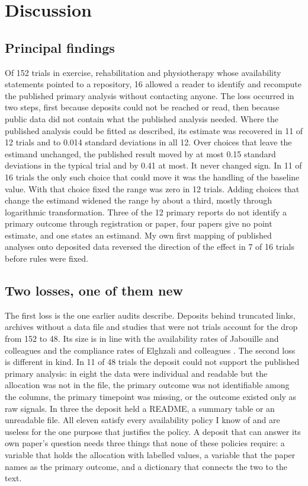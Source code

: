 \section{Discussion}\label{discussion}

\subsection{Principal findings}\label{principal-findings}

Of 152 trials in exercise, rehabilitation and physiotherapy whose availability statements pointed to a repository, 16 allowed a reader to identify and recompute the published primary analysis without contacting anyone. The loss occurred in two steps, first because deposits could not be reached or read, then because public data did not contain what the published analysis needed. Where the published analysis could be fitted as described, its estimate was recovered in 11 of 12 trials and to 0.014 standard deviations in all 12. Over choices that leave the estimand unchanged, the published result moved by at most 0.15 standard deviations in the typical trial and by 0.41 at most. It never changed sign. In 11 of 16 trials the only such choice that could move it was the handling of the baseline value. With that choice fixed the range was zero in 12 trials. Adding choices that change the estimand widened the range by about a third, mostly through logarithmic transformation. Three of the 12 primary reports do not identify a primary outcome through registration or paper, four papers give no point estimate, and one states an estimand. My own first mapping of published analyses onto deposited data reversed the direction of the effect in 7 of 16 trials before rules were fixed.

\subsection{Two losses, one of them new}\label{two-losses-one-of-them-new}

The first loss is the one earlier audits describe. Deposits behind truncated links, archives without a data file and studies that were not trials account for the drop from 152 to 48. Its size is in line with the availability rates of Jabouille and colleagues and the compliance rates of Elghzali and colleagues \cite{Jabouille_2025,Elghzali_2025}. The second loss is different in kind. In 11 of 48 trials the deposit could not support the published primary analysis: in eight the data were individual and readable but the allocation was not in the file, the primary outcome was not identifiable among the columns, the primary timepoint was missing, or the outcome existed only as raw signals. In three the deposit held a README, a summary table or an unreadable file. All eleven satisfy every availability policy I know of and are useless for the one purpose that justifies the policy. A deposit that can answer its own paper's question needs three things that none of these policies require: a variable that holds the allocation with labelled values, a variable that the paper names as the primary outcome, and a dictionary that connects the two to the text.

